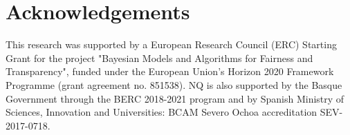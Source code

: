 \section*{Acknowledgements}
This research was supported by a European Research Council (ERC) Starting Grant for the project
"Bayesian Models and Algorithms for Fairness and Transparency", funded under the European Union's
Horizon 2020 Framework Programme (grant agreement no. 851538). NQ is also supported by the Basque
Government through the BERC 2018-2021 program and by Spanish Ministry of Sciences, Innovation and
Universities: BCAM Severo Ochoa accreditation SEV-2017-0718.

